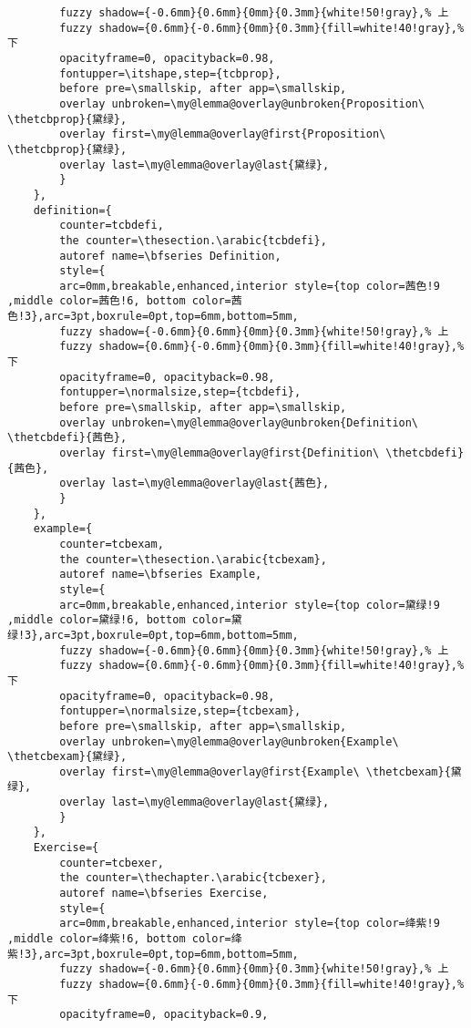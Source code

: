 \documentclass[lang=cn,zihao=-4,a4paper,fontset=windows]{beautybook}
\begin{document}
\begin{lstlisting}
        fuzzy shadow={-0.6mm}{0.6mm}{0mm}{0.3mm}{white!50!gray},% 上
        fuzzy shadow={0.6mm}{-0.6mm}{0mm}{0.3mm}{fill=white!40!gray},%下
        opacityframe=0, opacityback=0.98,
        fontupper=\itshape,step={tcbprop},
        before pre=\smallskip, after app=\smallskip,
        overlay unbroken=\my@lemma@overlay@unbroken{Proposition\ \thetcbprop}{黛绿},
        overlay first=\my@lemma@overlay@first{Proposition\ \thetcbprop}{黛绿},
        overlay last=\my@lemma@overlay@last{黛绿},
        }
    },
    definition={
        counter=tcbdefi,
        the counter=\thesection.\arabic{tcbdefi},
        autoref name=\bfseries Definition,
        style={
        arc=0mm,breakable,enhanced,interior style={top color=茜色!9 ,middle color=茜色!6, bottom color=茜色!3},arc=3pt,boxrule=0pt,top=6mm,bottom=5mm,
        fuzzy shadow={-0.6mm}{0.6mm}{0mm}{0.3mm}{white!50!gray},% 上
        fuzzy shadow={0.6mm}{-0.6mm}{0mm}{0.3mm}{fill=white!40!gray},%下
        opacityframe=0, opacityback=0.98,
        fontupper=\normalsize,step={tcbdefi},
        before pre=\smallskip, after app=\smallskip,
        overlay unbroken=\my@lemma@overlay@unbroken{Definition\ \thetcbdefi}{茜色},
        overlay first=\my@lemma@overlay@first{Definition\ \thetcbdefi}{茜色},
        overlay last=\my@lemma@overlay@last{茜色},
        }
    },
    example={
        counter=tcbexam,
        the counter=\thesection.\arabic{tcbexam},
        autoref name=\bfseries Example,
        style={
        arc=0mm,breakable,enhanced,interior style={top color=黛绿!9 ,middle color=黛绿!6, bottom color=黛绿!3},arc=3pt,boxrule=0pt,top=6mm,bottom=5mm,
        fuzzy shadow={-0.6mm}{0.6mm}{0mm}{0.3mm}{white!50!gray},% 上
        fuzzy shadow={0.6mm}{-0.6mm}{0mm}{0.3mm}{fill=white!40!gray},%下
        opacityframe=0, opacityback=0.98,
        fontupper=\normalsize,step={tcbexam},
        before pre=\smallskip, after app=\smallskip,
        overlay unbroken=\my@lemma@overlay@unbroken{Example\ \thetcbexam}{黛绿},
        overlay first=\my@lemma@overlay@first{Example\ \thetcbexam}{黛绿},
        overlay last=\my@lemma@overlay@last{黛绿},
        }
    },
    Exercise={
        counter=tcbexer,
        the counter=\thechapter.\arabic{tcbexer},
        autoref name=\bfseries Exercise,
        style={
        arc=0mm,breakable,enhanced,interior style={top color=绛紫!9 ,middle color=绛紫!6, bottom color=绛紫!3},arc=3pt,boxrule=0pt,top=6mm,bottom=5mm,
        fuzzy shadow={-0.6mm}{0.6mm}{0mm}{0.3mm}{white!50!gray},% 上
        fuzzy shadow={0.6mm}{-0.6mm}{0mm}{0.3mm}{fill=white!40!gray},%下
        opacityframe=0, opacityback=0.9,

\end{lstlisting}
\end{document}
